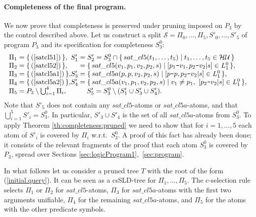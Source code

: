 \documentclass{tlp}
\newcommand*{\mydash}{{\mbox{\tt-}}}
\newcommand*{\HU}{{\ensuremath{\cal{H U}}}\xspace}
\renewcommand*{\S}{{\ensuremath{\mathscr S}}\xspace}
\begin{document}
\paragraph{Completeness of the final program.}
We now prove that completeness is preserved under pruning imposed on $P_3$
by the control described above.  Let us construct a split 
$\S = \Pi_0,\ldots,\Pi_5,S'_0,\ldots,S'_5$
of program $P_3$ and its specification for completeness
$S_3^0$:
\[
\begin{array}{l@{}l}
\Pi_1 = \{\, (\ref{satcl51}) \,\},
& 
S'_1 = S'_2 =  S_3^0\cap\{\, sat\_cl5(t_1,\ldots,t_5)  \mid 
                   t_1,\ldots,t_5\in \HU   \,\}
\\
\Pi_2 = \{\, (\ref{satcl52}) \,\}, 
&
\quad\ 
 = \{\, sat\_cl5(v_1,p_1,v_2,p_2,s)  \mid 
                    [p_1\mydash v_1,p_2\mydash v_2|s]\in L_1^0 \,\},
\\
\Pi_3 = \{\, (\ref{satcl5a1}) \,\},
& 
    S'_3 = \{\, sat\_cl5a(p,p,v_2,p_2,s) \mid 
                     [p\mydash p,p_2\mydash v_2|s]\in L_1^0 \,\},
\\
\Pi_4 = \{\, (\ref{satcl5a2}) \,\},
& 
    S'_4 = \{\, sat\_cl5a(v_1,p_1,v_2,p_2,s) \mid v_1\neq p_1,\
                     [p_2\mydash v_2|s]\in L_1^0\,\},
\\
\Pi_5 = P_3\setminus\bigcup_{i=1}^4\Pi_i,
&
\qquad\
    S'_5 = S_3^0\setminus (S'_1\cup S'_3\cup S'_4).
\end{array}
\]
Note that $S'_5$ does not contain any $sat\_cl5$-atoms or $sat\_cl5a$-atoms,
and that $\bigcup_{i=1}^5 S'_i = S_3^0$.
In particular, $S'_3\cup S'_4$ is the set of all $sat\_cl5a$-atoms from $S_3^0$.
To apply Theorem \ref{th:completeness:pruned}
we need to show that
for $i=1,\ldots,5$ each atom of $S'_i$ is covered by $\Pi_i$ w.r.t.\ $S_3^0$.
A proof of this fact has already been
done; 
it consists of the relevant fragments of the proof that 
each atom $S_3^0$ is covered by $P_3$, spread over Sections
\ref{sec:logicProgram1},~\ref{sec:program}.












In what follows let us consider
a pruned tree $T$ with the root of the form (\ref{initial.query}).  It
can be seen as a csSLD-tree for $\Pi_1,\ldots,\Pi_5$.  The c-selection rule
selects $\Pi_1$ or $\Pi_2$ for  $sat\_cl5$-atoms, 
$\Pi_3$ for $sat\_cl5a$-atoms with the first two arguments unifiable,
$\Pi_4$ for the remaining $sat\_cl5a$-atoms,
and $\Pi_5$ for the atoms with the other predicate symbols.
\end{document}
